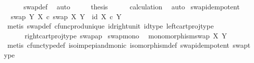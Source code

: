 \begin{isabellebody}
\ \ \ \ \isamarkupfalse%
\ swap{\isacharunderscore}{\kern0pt}def\ \isamarkupfalse%
\ auto\isanewline
\ \ \isamarkupfalse%
\ \isamarkupfalse%
\ {\isacharquery}{\kern0pt}thesis\isanewline
\ \ \ \ \isamarkupfalse%
\ calculation\ \isamarkupfalse%
\ auto\isanewline
{}\isamarkupfalse%
%
\endisatagproof
{\isafoldproof}%
%
\isadelimproof
\isanewline
%
\endisadelimproof
\isanewline
{}\isamarkupfalse%
\ swap{\isacharunderscore}{\kern0pt}idempotent{\isacharcolon}{\kern0pt}\isanewline
\ \ {\isachardoublequoteopen}swap\ Y\ X\ {\isasymcirc}\isactrlsub c\ swap\ X\ Y\ {\isacharequal}{\kern0pt}\ id\ {\isacharparenleft}{\kern0pt}X\ {\isasymtimes}\isactrlsub c\ Y{\isacharparenright}{\kern0pt}{\isachardoublequoteclose}\isanewline
%
\isadelimproof
\ \ %
\endisadelimproof
%
\isatagproof
{}\isamarkupfalse%
\ {\isacharparenleft}{\kern0pt}metis\ swap{\isacharunderscore}{\kern0pt}def\ cfunc{\isacharunderscore}{\kern0pt}prod{\isacharunderscore}{\kern0pt}unique\ id{\isacharunderscore}{\kern0pt}right{\isacharunderscore}{\kern0pt}unit{}\ id{\isacharunderscore}{\kern0pt}type\ left{\isacharunderscore}{\kern0pt}cart{\isacharunderscore}{\kern0pt}proj{\isacharunderscore}{\kern0pt}type\isanewline
\ \ \ \ \ \ right{\isacharunderscore}{\kern0pt}cart{\isacharunderscore}{\kern0pt}proj{\isacharunderscore}{\kern0pt}type\ swap{\isacharunderscore}{\kern0pt}ap{\isacharparenright}{\kern0pt}%
\endisatagproof
{\isafoldproof}%
%
\isadelimproof
\isanewline
%
\endisadelimproof
\isanewline
{}\isamarkupfalse%
\ swap{\isacharunderscore}{\kern0pt}mono{\isacharcolon}{\kern0pt}\isanewline
\ \ {\isachardoublequoteopen}monomorphism{\isacharparenleft}{\kern0pt}swap\ X\ Y{\isacharparenright}{\kern0pt}{\isachardoublequoteclose}\isanewline
%
\isadelimproof
\ \ %
\endisadelimproof
%
\isatagproof
{}\isamarkupfalse%
\ {\isacharparenleft}{\kern0pt}metis\ cfunc{\isacharunderscore}{\kern0pt}type{\isacharunderscore}{\kern0pt}def\ iso{\isacharunderscore}{\kern0pt}imp{\isacharunderscore}{\kern0pt}epi{\isacharunderscore}{\kern0pt}and{\isacharunderscore}{\kern0pt}monic\ isomorphism{\isacharunderscore}{\kern0pt}def\ swap{\isacharunderscore}{\kern0pt}idempotent\ swap{\isacharunderscore}{\kern0pt}type{\isacharparenright}{\kern0pt}%
\endisatagproof
{\isafoldproof}%
%
\isadelimproof
%
\endisadelimproof
%
\isadelimdocument
%
\endisadelimdocument
%
\isatagdocument
%
\isamarkuptrue%

\end{isabellebody}

